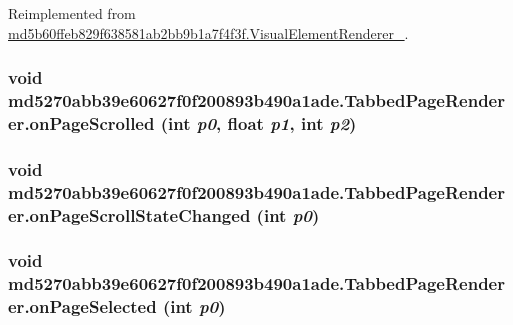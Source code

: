 Reimplemented from \hyperlink{classmd5b60ffeb829f638581ab2bb9b1a7f4f3f_1_1_visual_element_renderer__1_8c7af843aeec04827cb3a3981ea1978d}{md5b60ffeb829f638581ab2bb9b1a7f4f3f.VisualElementRenderer\_}.\hypertarget{classmd5270abb39e60627f0f200893b490a1ade_1_1_tabbed_page_renderer_2be7798b85b19ace799e0aac88245757}{
\subsubsection[{onPageScrolled}]{\setlength{\rightskip}{0pt plus 5cm}void md5270abb39e60627f0f200893b490a1ade.TabbedPageRenderer.onPageScrolled (int {\em p0}, \/  float {\em p1}, \/  int {\em p2})}}
\label{classmd5270abb39e60627f0f200893b490a1ade_1_1_tabbed_page_renderer_2be7798b85b19ace799e0aac88245757}


\hypertarget{classmd5270abb39e60627f0f200893b490a1ade_1_1_tabbed_page_renderer_6ee3c70ee2769ea4ce88b1c0e7accd74}{
\subsubsection[{onPageScrollStateChanged}]{\setlength{\rightskip}{0pt plus 5cm}void md5270abb39e60627f0f200893b490a1ade.TabbedPageRenderer.onPageScrollStateChanged (int {\em p0})}}
\label{classmd5270abb39e60627f0f200893b490a1ade_1_1_tabbed_page_renderer_6ee3c70ee2769ea4ce88b1c0e7accd74}


\hypertarget{classmd5270abb39e60627f0f200893b490a1ade_1_1_tabbed_page_renderer_1d0954491d422f9bedb21658957b4bfb}{
\subsubsection[{onPageSelected}]{\setlength{\rightskip}{0pt plus 5cm}void md5270abb39e60627f0f200893b490a1ade.TabbedPageRenderer.onPageSelected (int {\em p0})}}
\label{classmd5270abb39e60627f0f200893b490a1ade_1_1_tabbed_page_renderer_1d0954491d422f9bedb21658957b4bfb}


